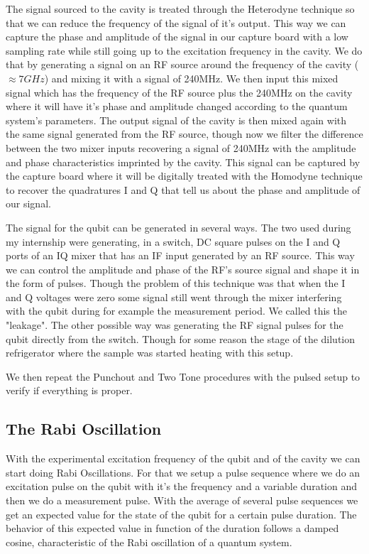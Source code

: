\documentclass[11pt,onecolumm,a4paper]{article}
\begin{document}
The signal sourced to the cavity is treated through the Heterodyne technique so that we can reduce the frequency of the signal of it's output. This way we can capture the phase and amplitude of the signal in our capture board with a low sampling rate while still going up to the excitation frequency in the cavity. We do that by generating a signal on an RF source around the frequency of the cavity ($\approx 7GHz $) and mixing it with a signal of 240MHz. We then input this mixed signal  which has the frequency of the RF source plus the 240MHz on the cavity where it will have it's phase and amplitude changed according to the quantum system's parameters. The output signal of the cavity is then mixed again with the same signal generated from the RF source, though now we filter the difference between the two mixer inputs recovering a signal of 240MHz with the amplitude and phase characteristics imprinted by the cavity. This signal can be captured by the capture board where it will be digitally treated with the Homodyne technique to recover the quadratures I and Q that tell us about the phase and amplitude of our signal.

The signal for the qubit can be generated in several ways. The two used during my internship were generating, in a switch, DC square pulses on the I and Q ports of an IQ mixer that has an IF input generated by an RF source. This way we can control the amplitude and phase of the RF's source signal and shape it in the form of pulses. Though the problem of this technique was that when the I and Q voltages were zero some signal still went through the mixer interfering with the qubit during for example the measurement period. We called this the "leakage". The other possible way was generating the RF signal pulses for the qubit directly from the switch. Though for some reason the stage of the dilution refrigerator where the sample was started heating with this setup.

We then repeat the Punchout and Two Tone procedures with the pulsed setup to verify if everything is proper.

\subsection{The Rabi Oscillation}
With the experimental excitation frequency of the qubit and of the cavity we can start doing Rabi Oscillations. For that we setup a pulse sequence where we do an excitation pulse on the qubit with it's the frequency and a variable duration and then we do a measurement pulse. With the average of several pulse sequences we get an expected value for the state of the qubit for a certain pulse duration. The behavior of this expected value in function of the duration follows a damped cosine, characteristic of the Rabi oscillation of a quantum system.
\end{document}
